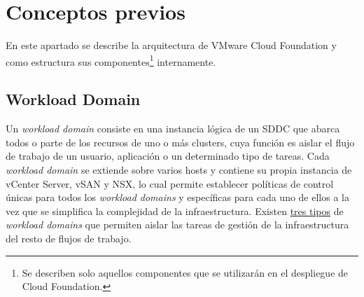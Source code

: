 \section{Conceptos previos}
En este apartado se describe la arquitectura de VMware Cloud Foundation y como estructura sus componentes\footnote{Se describen solo aquellos componentes que se utilizarán en el despliegue de Cloud Foundation.} internamente.

\subsection{Workload Domain}
Un \textit{workload domain} consiste en una instancia lógica de un SDDC que abarca todos o parte de los recursos de uno o más clusters, cuya función es aislar el flujo de trabajo de un usuario, aplicación o un determinado tipo de tareas. Cada \textit{workload domain} se extiende sobre varios hosts y contiene su propia instancia de vCenter Server, vSAN y NSX, lo cual permite establecer políticas de control únicas para todos los \textit{workload domains} y específicas para cada uno de ellos a la vez que se simplifica la complejidad de la infraestructura. Existen \underline{tres tipos} de \textit{workload domains} que permiten aislar las tareas de gestión de la infraestructura del resto de flujos de trabajo. 

